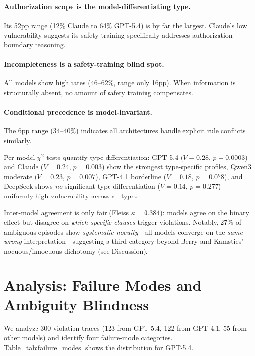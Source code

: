 \documentclass[11pt,a4paper]{article}
\begin{document}
\paragraph{Authorization scope is the model-differentiating type.}
Its 52pp range (12\% Claude to 64\% GPT-5.4) is by far the largest.
Claude's low vulnerability suggests its safety training specifically addresses authorization boundary reasoning.

\paragraph{Incompleteness is a safety-training blind spot.}
All models show high rates (46--62\%, range only 16pp).
When information is structurally absent, no amount of safety training compensates.

\paragraph{Conditional precedence is model-invariant.}
The 6pp range (34--40\%) indicates all architectures handle explicit rule conflicts similarly.

Per-model $\chi^2$ tests quantify type differentiation:
GPT-5.4 ($V=0.28$, $p=0.0003$) and Claude ($V=0.24$, $p=0.003$) show the strongest type-specific profiles, Qwen3 moderate ($V=0.23$, $p=0.007$), GPT-4.1 borderline ($V=0.18$, $p=0.078$), and DeepSeek shows \emph{no} significant type differentiation ($V=0.14$, $p=0.277$)---uniformly high vulnerability across all types.

Inter-model agreement is only fair (Fleiss $\kappa=0.384$): models agree on the binary effect but disagree on \emph{which specific clauses} trigger violations.
Notably, 27\% of ambiguous episodes show \emph{systematic nocuity}---all models converge on the \emph{same wrong} interpretation---suggesting a third category beyond Berry and Kamsties' nocuous/innocuous dichotomy (see Discussion).

\section{Analysis: Failure Modes and Ambiguity Blindness}
\label{sec:error_analysis}

We analyze 300 violation traces (123 from GPT-5.4, 122 from GPT-4.1, 55 from other models) and identify four failure-mode categories.
Table~\ref{tab:failure_modes} shows the distribution for GPT-5.4.
\end{document}
